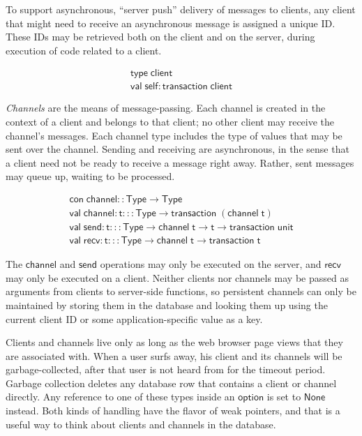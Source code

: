 \documentclass{article}
\newcommand{\mt}[1]{\mathsf{#1}}
\begin{document}
To support asynchronous, ``server push'' delivery of messages to clients, any client that might need to receive an asynchronous message is assigned a unique ID.  These IDs may be retrieved both on the client and on the server, during execution of code related to a client.

$$\begin{array}{l}
  \mt{type} \; \mt{client} \\
  \mt{val} \; \mt{self} : \mt{transaction} \; \mt{client}
\end{array}$$

\emph{Channels} are the means of message-passing.  Each channel is created in the context of a client and belongs to that client; no other client may receive the channel's messages.  Each channel type includes the type of values that may be sent over the channel.  Sending and receiving are asynchronous, in the sense that a client need not be ready to receive a message right away.  Rather, sent messages may queue up, waiting to be processed.

$$\begin{array}{l}
  \mt{con} \; \mt{channel} :: \mt{Type} \to \mt{Type} \\
  \mt{val} \; \mt{channel} : \mt{t} ::: \mt{Type} \to \mt{transaction} \; (\mt{channel} \; \mt{t}) \\
  \mt{val} \; \mt{send} : \mt{t} ::: \mt{Type} \to \mt{channel} \; \mt{t} \to \mt{t} \to \mt{transaction} \; \mt{unit} \\
  \mt{val} \; \mt{recv} : \mt{t} ::: \mt{Type} \to \mt{channel} \; \mt{t} \to \mt{transaction} \; \mt{t}
\end{array}$$

The $\mt{channel}$ and $\mt{send}$ operations may only be executed on the server, and $\mt{recv}$ may only be executed on a client.  Neither clients nor channels may be passed as arguments from clients to server-side functions, so persistent channels can only be maintained by storing them in the database and looking them up using the current client ID or some application-specific value as a key.

Clients and channels live only as long as the web browser page views that they are associated with.  When a user surfs away, his client and its channels will be garbage-collected, after that user is not heard from for the timeout period.  Garbage collection deletes any database row that contains a client or channel directly.  Any reference to one of these types inside an $\mt{option}$ is set to $\mt{None}$ instead.  Both kinds of handling have the flavor of weak pointers, and that is a useful way to think about clients and channels in the database.
\end{document}
